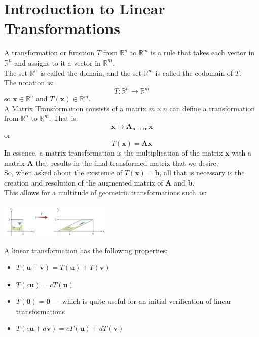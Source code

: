 \documentclass[nobib]{tufte-handout}
\begin{document}
\section{Introduction to Linear Transformations}
A transformation or function $T$ from $\mathbb{R}^n$ to $\mathbb{R}^m$ is a
rule that takes each vector in $\mathbb{R}^n$ and assigns to it a vector in
$\mathbb{R}^m$.\\ The set $\mathbb{R}^n$ is called the domain, and the set
$\mathbb{R}^m$ is called the codomain of $T$.\\ The notation is:
\begin{equation*}
    T: \mathbb{R}^n \rightarrow \mathbb{R}^m
\end{equation*}
so $\mathbf{x}\in\mathbb{R}^n$ and $T(\mathbf{x})\in\mathbb{R}^m$.\\
A Matrix Transformation consists of a matrix $m\times n$ can define a transformation from $\mathbb{R}^n$ to $\mathbb{R}^m$.
That is:
\begin{equation*}
    \mathbf{x \mapsto A_{n\rightarrow m}x}
\end{equation*}
or
\begin{equation*}
    T(\mathbf{x})=\mathbf{Ax}
\end{equation*}
In essence, a matrix transformation is the multiplication of the matrix \textbf{x} with a matrix \textbf{A} that results in the final transformed matrix that we desire.\\
So, when asked about the existence of $T(\mathbf{x})=\mathbf{b}$, all that is necessary is the creation and resolution of the augmented matrix of \textbf{A} and \textbf{b}.\\
This allows for a multitude of geometric transformations such as:
\begin{center}
    \includegraphics[width = 200px]{images/transformation_use.png}
\end{center}
A linear transformation has the following properties:
\begin{itemize}
    \item $T(\mathbf{u+v})=T(\mathbf{u})+T(\mathbf{v})$
    \item $T(c\mathbf{u})=cT(\mathbf{u})$
    \item $T(\mathbf{0})=\mathbf{0}$ --- which is quite useful for an initial verification of linear transformations
    \item $T(c\mathbf{u}+d\mathbf{v})= cT(\mathbf{u})+dT(\mathbf{v})$
\end{itemize}
\end{document}
